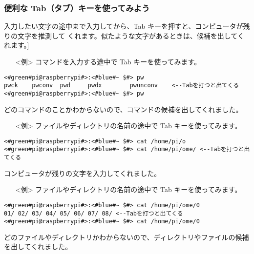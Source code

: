 \subsubsection{便利な Tab（タブ）キーを使ってみよう}
入力したい文字の途中まで入力してから、Tab キーを押すと、コンピュータが残りの文字を推測して
くれます。似たような文字があるときは、候補を出してくれます。]
\begin{itemize}
\item[<例>]コマンドを入力する途中で Tab キーを使ってみます。
\end{itemize}
\begin{lstlisting}[caption=Tabの例1, label=Tab1]
<#green#pi@raspberrypi#>:<#blue#~ $#> pw
pwck	pwconv	pwd		pwdx		pwunconv	<--Tabを打つと出てくる
<#green#pi@raspberrypi#>:<#blue#~ $#> pw
\end{lstlisting}
どのコマンドのことかわからないので、コマンドの候補を出してくれました。
\begin{itemize}
\item[<例>]ファイルやディレクトリの名前の途中で Tab キーを使ってみます。
\end{itemize}
\begin{lstlisting}[caption=Tabの例2, label=Tab2]
<#green#pi@raspberrypi#>:<#blue#~ $#> cat /home/pi/o
<#green#pi@raspberrypi#>:<#blue#~ $#> cat /home/pi/ome/	<--Tabを打つと出てくる
\end{lstlisting}
コンピュータが残りの文字を入力してくれました。
\begin{itemize}
\item[<例>]ファイルやディレクトリの名前の途中で Tab キーを使ってみます。
\end{itemize}
\begin{lstlisting}[caption=Tabの例3, label=Tab3]
<#green#pi@raspberrypi#>:<#blue#~ $#> cat /home/pi/ome/0
01/	02/	03/	04/	05/	06/	07/	08/	<--Tabを打つと出てくる
<#green#pi@raspberrypi#>:<#blue#~ $#> cat /home/pi/ome/0
\end{lstlisting}
どのファイルやディレクトリかわからないので、ディレクトリやファイルの候補を出してくれました。

